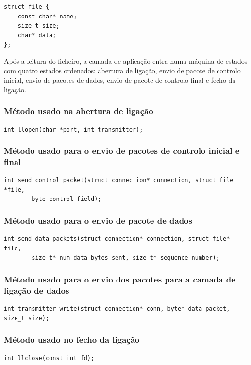 \documentclass[a4paper,11pt,titlepage]{article}
\begin{document}
\begin{lstlisting}[style=customc]
struct file {
    const char* name;
    size_t size;
    char* data;
};
\end{lstlisting}

Após a leitura do ficheiro, a camada de aplicação entra numa máquina de estados com quatro estados ordenados: abertura de ligação, envio de pacote de controlo inicial, envio de pacotes de dados, envio de pacote de controlo final e fecho da ligação.

\subsubsection*{Método usado na abertura de ligação}

\begin{lstlisting}[style=customc]
int llopen(char *port, int transmitter);
\end{lstlisting}

\subsubsection*{Método usado para o envio de pacotes de controlo inicial e final}
\begin{lstlisting}[style=customc]
int send_control_packet(struct connection* connection, struct file *file,
        byte control_field);
\end{lstlisting}

\subsubsection*{Método usado para o envio de pacote de dados}
\begin{lstlisting}[style=customc]
int send_data_packets(struct connection* connection, struct file* file,
        size_t* num_data_bytes_sent, size_t* sequence_number);
\end{lstlisting}

\subsubsection*{Método usado para o envio dos pacotes para a camada de ligação de dados}
\begin{lstlisting}[style=customc]
int transmitter_write(struct connection* conn, byte* data_packet, size_t size);
\end{lstlisting}

\subsubsection*{Método usado no fecho da ligação}
\begin{lstlisting}[style=customc]
int llclose(const int fd);
\end{lstlisting}
\end{document}
